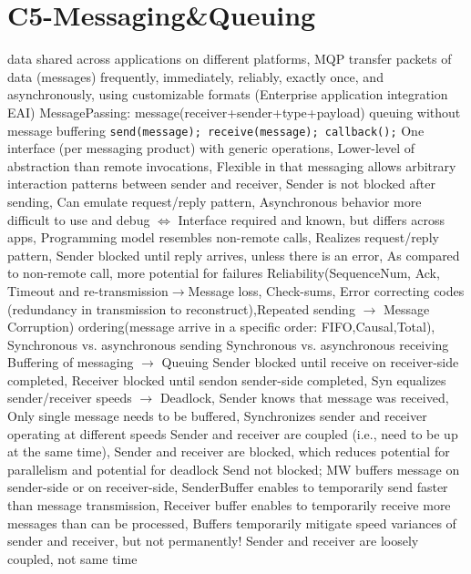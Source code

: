 \section{C5-Messaging\&Queuing}
data shared across applications on different platforms, MQP  transfer packets of data (messages) frequently, immediately, reliably, 
exactly once, and asynchronously, using customizable formats (Enterprise application integration EAI)
\textbar MessagePassing: message(receiver+sender+type+payload) queuing without message buffering
\lstinline{send(message); receive(message); callback();}
\textbar {}
One interface (per messaging product) with generic operations,
Lower-level of abstraction than remote invocations,
Flexible in that messaging allows arbitrary interaction patterns between sender and receiver,
Sender is not blocked after sending,
Can emulate request/reply pattern,
Asynchronous behavior more difficult to use and debug
$\Leftrightarrow$
Interface required and known, but differs across apps, 
Programming model resembles non-remote calls,
Realizes request/reply pattern,
Sender blocked until reply arrives, unless there is an error,
As compared to non-remote call, more potential for failures
\textbar {}
Reliability(SequenceNum, Ack, Timeout and re-transmission$\rightarrow$Message loss,
Check-sums, Error correcting codes (redundancy in transmission to reconstruct),Repeated sending $\rightarrow$ Message Corruption)
ordering(message arrive in a specific order: FIFO,Causal,Total),
Synchronous vs. asynchronous sending
Synchronous vs. asynchronous receiving
Buffering of messaging $\rightarrow$ Queuing
\textbar {}
Sender blocked until receive on receiver-side completed,
Receiver blocked until sendon sender-side completed,
Syn equalizes sender/receiver speeds $\rightarrow$ Deadlock,
\btext{+:}
Sender knows that message was received,
Only single message needs to be buffered,
Synchronizes sender and receiver operating at different speeds
\btext{-:}
Sender and receiver are coupled (i.e., need to be up at the same time),
Sender and receiver are blocked, which reduces potential for parallelism and potential for deadlock
\textbar {}
Send not blocked; MW buffers message on sender-side or on receiver-side,
SenderBuffer enables to temporarily send faster than message transmission,
Receiver buffer enables to temporarily receive more messages than can be processed,
Buffers temporarily mitigate speed variances of sender and receiver, but not permanently!
\btext{+:}
Sender and receiver are loosely coupled, not same time
